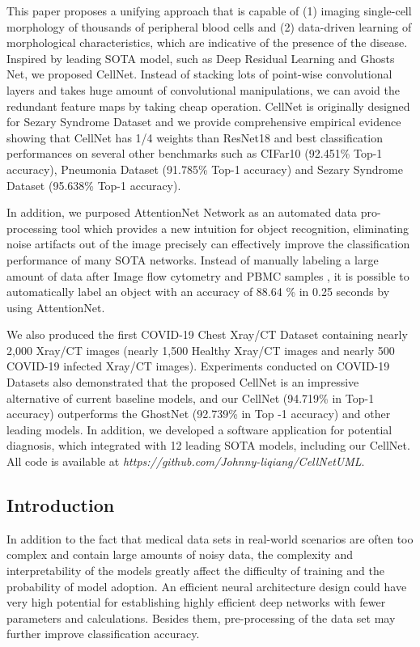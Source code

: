 This paper proposes a unifying approach that is capable of (1) imaging single-cell morphology of thousands of peripheral blood cells and (2) data-driven learning of morphological characteristics, which are indicative of the presence of the disease.
Inspired by leading SOTA model, such as Deep Residual Learning\cite{b20} and Ghosts Net\cite{b19}, we proposed CellNet. Instead of stacking lots of point-wise convolutional layers and takes huge amount of convolutional manipulations, we can avoid the redundant feature maps by taking cheap operation. CellNet is originally designed for Sezary Syndrome Dataset and we provide comprehensive empirical evidence showing that CellNet has 1/4 weights than ResNet18 \cite{b20} and best classification performances on several other benchmarks such as CIFar10 \cite{b21} (92.451\% Top-1 accuracy), Pneumonia Dataset\cite{b38} (91.785\% Top-1 accuracy) and Sezary Syndrome Dataset (95.638\% Top-1 accuracy).

In addition, we purposed AttentionNet Network as an automated data pro-processing tool which provides a new intuition for object recognition, eliminating noise artifacts out of the image precisely can effectively improve the classification performance of many SOTA networks. Instead of manually labeling a large amount of data after Image flow cytometry and PBMC samples \cite{b12}, it is possible to automatically label an object with an accuracy of 88.64 \% in 0.25 seconds by using AttentionNet. 

We also produced the first COVID-19 Chest Xray/CT Dataset containing nearly 2,000 Xray/CT images (nearly 1,500 Healthy Xray/CT images and nearly 500 COVID-19 infected Xray/CT images). Experiments conducted on COVID-19 Datasets also demonstrated that the proposed CellNet is an impressive alternative of current baseline models, and our CellNet (94.719\% in Top-1 accuracy) outperforms the GhostNet\cite{b19} (92.739\%  in Top -1 accuracy) and other leading models. In addition, we developed a software application for potential diagnosis, which integrated with 12 leading SOTA models, including our CellNet. All code is available at \textit{https://github.com/Johnny-liqiang/CellNetUML}.

\subsection{Introduction}
\label{sec:Introduction}
In addition to the fact that medical data sets in real-world scenarios are often too complex and contain large amounts of noisy data, the complexity and interpretability of the models greatly affect the difficulty of training and the probability of model adoption.
An efficient neural architecture design could have very high potential for establishing highly efficient deep networks with fewer parameters and calculations\cite{b19}. Besides them, pre-processing of the data set may further improve classification accuracy.
 
